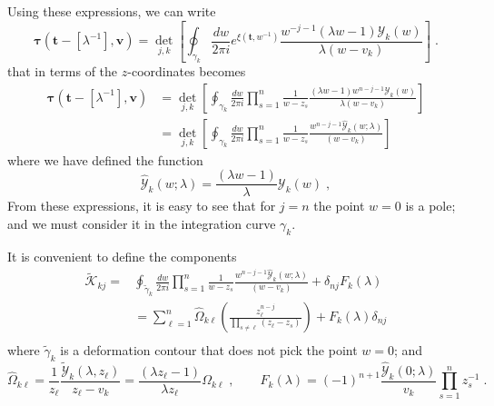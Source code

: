 \documentclass[a4paper,12pt]{amsart}
\begin{document}
Using these expressions, we can write 
\begin{equation}
  \bm{\tau}(\bm{t} - [\lambda^{-1}], \bm{v}) =
  \det_{j,k}\left[
  \oint_{\gamma_k} \frac{dw}{2\pi i} e^{\xi(\bm{t}, w^{-1})} \frac{w^{- j -1} ( \lambda w - 1) \mathcal{Y}_k(w)}{\lambda(w - v_k)} 
  \right]\; .
\end{equation}
that in terms of the \(z\)-coordinates becomes
\begin{equation}
\begin{split}
  \bm{\tau}(\bm{t} - [\lambda^{-1}], \bm{v})
  & = \det_{j,k}\left[\oint_{\gamma_k} \frac{dw}{2\pi i} \prod_{s=1}^n \frac{1}{w - z_s}  
    \frac{( \lambda w - 1) w^{n-j-1}\mathcal{Y}_k(w)}{\lambda(w - v_k)} \right]\\
  & = \det_{j,k}\left[
    \oint_{\gamma_k} \frac{dw}{2\pi i} \prod_{s=1}^n \frac{1}{w - z_s}  
    \frac{w^{n-j-1}\widehat{\mathcal{Y}}_k(w; \lambda)}{(w - v_k)}
    \right]
\end{split}
\end{equation}
where we have defined the function 
\begin{equation}
  \widehat{\mathcal{Y}}_k(w; \lambda)
  = \frac{( \lambda w - 1)}{\lambda} \mathcal{Y}_k(w) \; ,
\end{equation}
From these expressions, it is easy to see that for \(j=n\) the point
\(w = 0\) is a pole; and we must consider it in the integration curve \(\gamma_k\). 

It is convenient to define the components
\begin{equation}
  \begin{split}
    \widetilde{\mathcal{K}}_{kj} = &
    \oint_{\tilde \gamma_k} \frac{dw}{2\pi i} \prod_{s=1}^n \frac{1}{w - z_s}
    \frac{w^{n-j-1}\widehat{\mathcal{Y}}_k(w; \lambda)}{(w - v_k)}
    + \delta_{nj} F_k(\lambda) \\
    & = \sum_{\ell = 1}^n  \widehat{\Omega}_{k \ell} \left( \frac{z_\ell^{n-j}}{\prod_{s\neq \ell} (z_\ell - z_s)} \right)
    + F_k(\lambda)\delta_{nj}  \\
  \end{split}
\end{equation}
where \(\tilde{\gamma}_k\) is a deformation contour that does not pick
the point \(w=0\); and
\begin{equation}
  \widehat{\Omega}_{k\ell}
  = \frac{1}{z_\ell} \frac{\widetilde{\mathcal{Y}}_k(\lambda, z_\ell)}{z_\ell - v_k}
  = \frac{(\lambda z_\ell -1)}{\lambda z_\ell} {\Omega}_{k\ell} 
\; , \qquad 
 F_k(\lambda) = (-1)^{n+1} \frac{\widehat{\mathcal{Y}}_k(0; \lambda)}{v_k }  \prod_{s=1}^n z_s^{-1} \; .
\end{equation}
\end{document}
